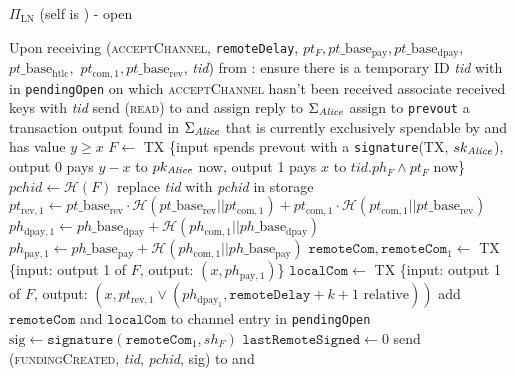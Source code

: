 \begin{protocolbox}{$\Pi_{\mathrm{LN}}$ (self is \alice) - open}
\begin{algorithmic}[1]
    \State Upon receiving (\textsc{acceptChannel}, \texttt{remoteDelay}, $pt_F,
    pt\_\mathrm{base}_{\mathrm{pay}}, pt\_\mathrm{base}_{\mathrm{dpay}},$
    $pt\_\mathrm{base}_{\mathrm{htlc}},$ $pt_{\mathrm{com}, 1},
    pt\_\mathrm{base}_{\mathrm{rev}}$, \textit{tid}) from \bob:
    \Indent
      \State ensure there is a temporary ID \textit{tid} with \bob{} in
      \texttt{pendingOpen} on which \textsc{acceptChannel} hasn't been received
      \State associate received keys with \textit{tid}
      \State send (\textsc{read}) to \ledger{} and assign reply to
      $\Sigma_{\mathit{Alice}}$
      \State assign to \texttt{prevout} a transaction output found in
      $\Sigma_{\mathit{Alice}}$ that is currently exclusively spendable by \alice{} and
      has value $y \geq x$
      \State $F \gets$ TX \{input spends prevout with a \texttt{signature}(TX,
      $sk_{\mathit{Alice}}$), output 0 pays $y - x$ to $pk_{\mathit{Alice}}$ now, output 1 pays
      $x$ to $\textit{tid}.ph_F \wedge pt_F$ now\}
      \State $\mathit{pchid} \gets \mathcal{H}\left(F\right)$
      \State replace \textit{tid} with \textit{pchid} in storage
      \State $pt_{\mathrm{rev}, 1} \gets pt\_\mathrm{base}_{\mathrm{rev}} \cdot
      \mathcal{H}\left(pt\_\mathrm{base}_{\mathrm{rev}} ||
      pt_{\mathrm{com}, 1}\right) + pt_{\mathrm{com}, 1} \cdot \mathcal{H}\left(
      pt_{\mathrm{com}, 1} || pt\_\mathrm{base}_{\mathrm{rev}}\right)$
      \State $ph_{\mathrm{dpay}, 1} \gets ph\_\mathrm{base}_{\mathrm{dpay}} +
      \mathcal{H}\left(ph_{\mathrm{com}, 1} ||
      ph\_\mathrm{base}_{\mathrm{dpay}}\right)$
      \State $ph_{\mathrm{pay}, 1} \gets ph\_\mathrm{base}_{\mathrm{pay}} +
      \mathcal{H}\left(ph_{\mathrm{com}, 1} ||
      ph\_\mathrm{base}_{\mathrm{pay}}\right)$
      \State $\mathtt{remoteCom}, \mathtt{remoteCom}_1 \gets$ TX \{input: output
      1 of $F$, output: $\left(x, ph_{\mathrm{pay}, 1}\right)$\}
      \State $\mathtt{localCom} \gets$ TX \{input: output 1 of $F$, output:
      $\left(x, pt_{\mathrm{rev}, 1} \vee \left(ph_{\mathrm{dpay}_1},
      \mathtt{remoteDelay} + k + 1 \text{ relative}\right)\right)$
      \State add $\mathtt{remoteCom}$ and $\mathtt{localCom}$ to channel entry
      in \texttt{pendingOpen}
      \State $\mathrm{sig} \gets \mathtt{signature}\left(\mathtt{remoteCom}_1,
      sh_F\right)$
      \State $\mathtt{lastRemoteSigned} \gets 0$
      \State send (\textsc{fundingCreated}, \textit{tid},
      \textit{pchid}, sig) to \bob{} and \adversary
    \EndIndent
    \State


\end{algorithmic}
\end{protocolbox}
